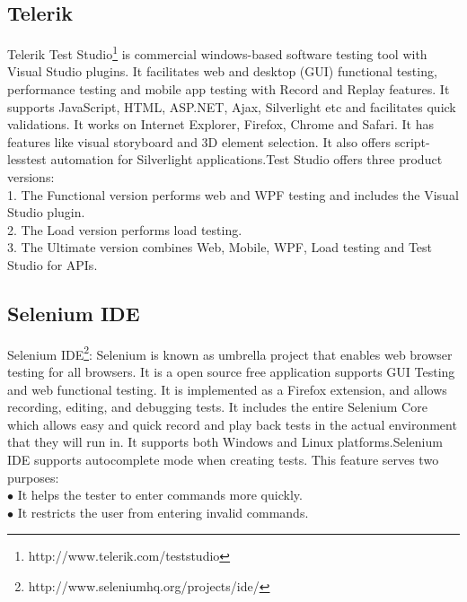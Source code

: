 \documentclass[12pt,journal]{IEEEtran}
\begin{document}
\subsection{Telerik}
Telerik Test Studio\footnote{http://www.telerik.com/teststudio} is commercial windows-based software testing tool with Visual Studio plugins. It facilitates web and desktop (GUI) functional testing, performance testing and mobile app testing with Record and Replay features. It supports JavaScript, HTML, ASP.NET, Ajax, Silverlight etc and facilitates quick validations. It works on Internet Explorer, Firefox, Chrome and Safari. It has features like visual storyboard and 3D element selection. It also offers script-lesstest automation for Silverlight applications.Test Studio offers three product versions:\\
1. The Functional version performs web and WPF testing and includes the Visual Studio plugin.\\
2. The Load version performs load testing.\\
3. The Ultimate version combines Web, Mobile, WPF, Load testing and Test Studio for APIs.\\

\subsection{Selenium IDE}
Selenium IDE\footnote{http://www.seleniumhq.org/projects/ide/}: Selenium is known as umbrella project that enables web browser testing for all browsers. It is a open source free application supports GUI Testing and web functional testing. It is implemented as a Firefox extension, and allows recording, editing, and debugging tests. It includes the entire Selenium Core which allows easy and quick record and play back tests in the actual environment that they will run in. It supports both Windows and Linux platforms.Selenium IDE supports autocomplete mode when creating tests. This feature serves two purposes:\\
$\bullet$ It helps the tester to enter commands more quickly.\\
$\bullet$ It restricts the user from entering invalid commands.\\
\end{document}
